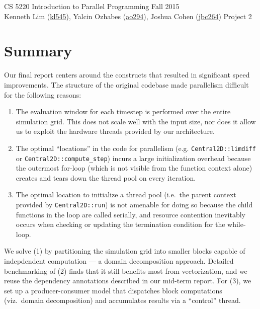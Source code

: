 \documentclass{scrartcl}
\begin{document}
  \begin{framed}
  CS 5220 Introduction to Parallel Programming \hfill Fall 2015 \\
  Kenneth Lim (\href{mailto:kl545@cornell.edu}{kl545}), Yalcin Ozhabes (\href{mailto:ao294@cornell.edu}{ao294}), Joshua Cohen (\href{mailto:jbc264@cornell.edu}{jbc264}) \hfill Project 2 \hspace{-3ex}
  \end{framed}
  \section{Summary}
  Our final report centers around the constructs that resulted in significant speed improvements. The structure of the original codebase made parallelism difficult for the following reasons:

  \begin{enumerate}
    \item The evaluation window for each timestep is performed over the entire simulation grid. This does not scale well with the input size, nor does it allow us to exploit the hardware threads provided by our architecture.
    \item The optimal ``locations'' in the code for parallelism (e.g. \texttt{Central2D::limdiff} or \texttt{Central2D::compute\_step}) incurs a large initialization overhead because the outermost for-loop (which is not visible from the function context alone) creates and tears down the thread pool on every iteration.
    \item The optimal location to initialize a thread pool (i.e.~the parent context provided by \texttt{Central2D::run}) is not amenable for doing so because the child functions in the loop are called serially, and resource contention inevitably occurs when checking or updating the termination condition for the while-loop.
  \end{enumerate}
  We solve (1) by partitioning the simulation grid into smaller blocks capable of indepdendent computation --- a domain decomposition approach. Detailed benchmarking of (2) finds that it still benefits most from vectorization, and we reuse the dependency annotations described in our mid-term report. For (3), we set up a producer-consumer model that dispatches block computations (viz.~domain decomposition) and accumulates results via a ``control'' thread.
\end{document}
